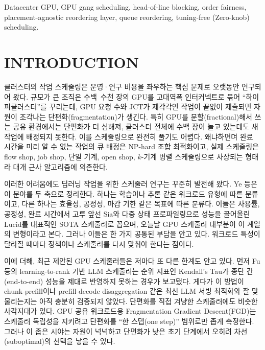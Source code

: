 \documentclass{ieeetj}
\begin{document}
\begin{IEEEkeywords}
Datacenter GPU, GPU gang scheduling, head-of-line blocking, order fairness, placement-agnostic reordering layer, queue reordering, tuning-free (Zero-knob) scheduling.
\end{IEEEkeywords}

\maketitle

\section{INTRODUCTION}\label{sec1}
 클러스터의 작업 스케줄링은 운영·연구 비용을 좌우하는 핵심 문제로 오랫동안 연구되어 왔다. 규모가 큰 조직은 수백~수천 장의 GPU를 고대역폭 인터커넥트로 묶어 ``하이퍼클러스터''를 꾸리는데, GPU 요청 수와 JCT가 제각각인 작업이 끝없이 제출되면 자원이 조각나는 단편화(fragmentation)가 생긴다\cite{athlur2022varuna}. 특히 GPU를 분할(fractional)해서 쓰는 공유 환경에서는 단편화가 더 심해져, 클러스터 전체에 수백 장이 놀고 있는데도 새 작업에 배정되지 못한다\cite{weng2023beware}. 이를 스케줄링으로 완전히 풀기도 어렵다. 왜냐하면며 완료 시간을 미리 알 수 없는 작업의 큐 배정은 NP-hard 조합 최적화이고\cite{ullman1975np}, 실제 스케줄링은 flow shop, job shop, 단일 기계, open shop, $k$-기계 병렬 스케줄링으로 사상되는 형태라\cite{b1} 대개 근사 알고리즘에 의존한다\cite{b2}.

이러한 어려움에도 딥러닝 작업을 위한 스케줄러 연구는 꾸준히 발전해 왔다. Ye 등\cite{b3}은 이 분야를 두 축으로 정리한다. 하나는 학습이나 추론 같은 워크로드 유형에 따른 분류이고, 다른 하나는 효율성, 공정성, 마감 기한 같은 목표에 따른 분류다. 이들은 사용률, 공정성, 완료 시간에서 고루 앞선 Sia\cite{b4}와 다중 상태 프로파일링으로 성능을 끌어올린 Lucid\cite{b5}를 대표적인 SOTA 스케줄러로 꼽으며, 오늘날 GPU 스케줄러 대부분이 이 계열의 변형이라고 본다. 그러나 이들은 한 가지 공통된 부담을 안고 있다. 워크로드 특성이 달라질 때마다 정책이나 스케줄러를 다시 맞춰야 한다는 점이다.

이에 더해, 최근 제안된 GPU 스케줄러들은 저마다 또 다른 한계도 안고 있다. 먼저 Fu 등\cite{fu2024efficient}의 learning-to-rank 기반 LLM 스케줄러는 순위 지표인 Kendall's Tau가 종단 간(end-to-end) 성능을 제대로 반영하지 못하는 경우가 보고됐다. 게다가 이 방법이 chunk-prefill이나 prefill-decode disaggregation 같은 최신 LLM 서빙 최적화와 잘 맞물리는지는 아직 충분히 검증되지 않았다\cite{fu2024efficient}. 단편화를 직접 겨냥한 스케줄러에도 비슷한 사각지대가 있다. GPU 공유 워크로드용 Fragmentation Gradient Descent(FGD)\cite{weng2023beware}는 스케줄러 독립성을 지키려고 단편화를 ``한 스텝(one step)'' 범위로만 좁게 측정한다. 그러나 이 좁은 시야는 자원이 넉넉하고 단편화가 낮은 초기 단계에서 오히려 차선(suboptimal)의 선택을 낳을 수 있다.
\end{document}
